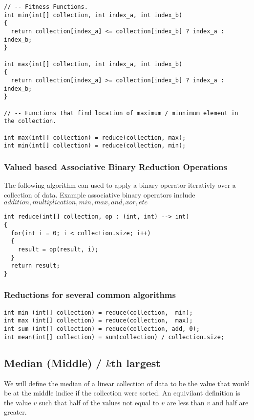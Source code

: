 \documentclass[12pt, letterpaper]{book}
\begin{document}
\begin{verbatim}
// -- Fitness Functions.
int min(int[] collection, int index_a, int index_b)
{
  return collection[index_a] <= collection[index_b] ? index_a : index_b;
}

int max(int[] collection, int index_a, int index_b)
{
  return collection[index_a] >= collection[index_b] ? index_a : index_b;
}

// -- Functions that find location of maximum / minnimum element in the collection.

int max(int[] collection) = reduce(collection, max);
int min(int[] collection) = reduce(collection, min);

\end{verbatim}

\newpage

\subsubsection{Valued based Associative Binary Reduction Operations}
The following algorithm can used to apply a binary operator iterativly over a collection of data. Example associative binary operators include $addition, multiplication, min, max, and, xor, etc$

\begin{verbatim}
int reduce(int[] collection, op : (int, int) --> int)
{
  for(int i = 0; i < collection.size; i++)
  {
    result = op(result, i);
  }
  return result;
}
\end{verbatim}

\subsubsection{Reductions for several common algorithms}

\begin{verbatim}
int min (int[] collection) = reduce(collection,  min);
int max (int[] collection) = reduce(collection,  max);
int sum (int[] collection) = reduce(collection, add, 0);
int mean(int[] collection) = sum(collection) / collection.size;
\end{verbatim}


\newpage
		\subsection{Median (Middle) / $k$th largest}

			We will define the median of a linear collection of data to be the value that would be at the middle indice if the collection were sorted. An equivilant definition is the value $v$ such that half of the values not equal to $v$ are less than $v$ and half are greater.
\end{document}
